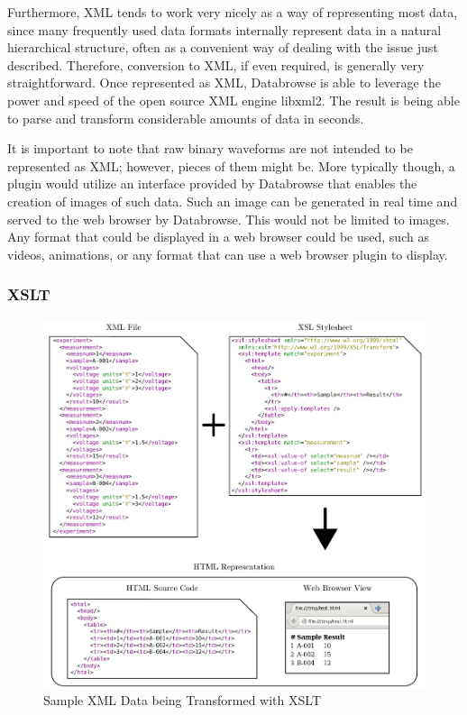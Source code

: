 \documentclass[10pt]{article}
\begin{document}
Furthermore, XML tends to work very nicely as a way of representing most data, since many frequently used data formats internally represent data in a natural hierarchical structure, often as a convenient way of dealing with the issue just described.  Therefore, conversion to XML, if even required, is generally very straightforward.  Once represented as XML, Databrowse is able to leverage the power and speed of the open source XML engine libxml2.  The result is being able to parse and transform considerable amounts of data in seconds.

It is important to note that raw binary waveforms are not intended to be represented as XML; however, pieces of them might be.  More typically though, a plugin would utilize an interface provided by Databrowse that enables the creation of images of such data.  Such an image can be generated in real time and served to the web browser by Databrowse.  This would not be limited to images.  Any format that could be displayed in a web browser could be used, such as videos, animations, or any format that can use a web browser plugin to display.

\subsubsection{XSLT}

\begin{figure}
	\includegraphics{Chapter4_XSLTSample.pdf}
	\caption{Sample XML Data being Transformed with XSLT}
	\label{fig:4:xsltsample}
\end{figure}
\end{document}
